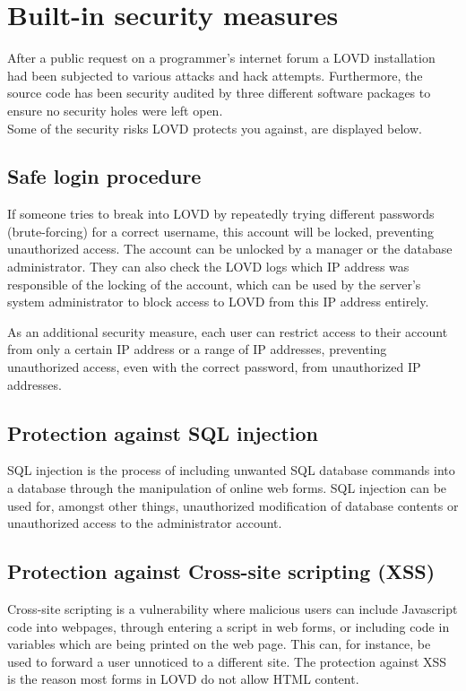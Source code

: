 \documentclass[a4paper,oneside,openany,12pt]{memoir}
\begin{document}
\section{Built-in security measures}
After a public request on a programmer's internet forum a LOVD installation had been subjected to various attacks and hack attempts.
Furthermore, the source code has been security audited by three different software packages to ensure no security holes were left open.\\
Some of the security risks LOVD protects you against, are displayed below.



\subsection{Safe login procedure}
If someone tries to break into LOVD by repeatedly trying different passwords (brute-forcing) for a correct username, this account will be locked, preventing unauthorized access.
The account can be unlocked by a manager or the database administrator.
They can also check the LOVD logs which IP address was responsible of the locking of the account, which can be used by the server's system administrator to block access to LOVD from this IP address entirely.

As an additional security measure, each user can restrict access to their account from only a certain IP address or a range of IP addresses, preventing unauthorized access, even with the correct password, from unauthorized IP addresses.



\subsection{Protection against SQL injection}
SQL injection is the process of including unwanted SQL database commands into a database through the manipulation of online web forms.
SQL injection can be used for, amongst other things, unauthorized modification of database contents or unauthorized access to the administrator account.



\subsection{Protection against Cross-site scripting (XSS)}
Cross-site scripting is a vulnerability where malicious users can include Javascript code into webpages,
 through entering a script in web forms, or including code in variables which are being printed on the web page.
This can, for instance, be used to forward a user unnoticed to a different site.
The protection against XSS is the reason most forms in LOVD do not allow HTML content.
\end{document}
